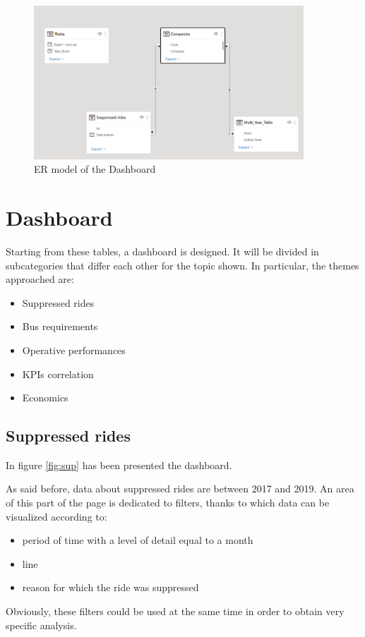 \begin{figure}[h]
    \centering
    \includegraphics[width=0.9\textwidth]{Images/traditional_dashboard/ER_model.png}
    \caption{ER model of the Dashboard}
    \label{fig:ER}
\end{figure}
\section{Dashboard}

Starting from these tables, a dashboard is designed. It will be divided in subcategories that differ each other for the topic shown. In particular, the themes approached are:
\begin{itemize}
\item Suppressed rides
\item Bus requirements
\item Operative performances
\item KPIs correlation
\item Economics
\end{itemize}
\subsection{Suppressed rides}
In figure \ref{fig:sup} has been presented the dashboard.
\newpage
\WarningsOff
\begin{landscape}
\thispagestyle{empty}

\end{landscape}
\newpage
As said before, data about suppressed rides are between 2017 and 2019. An area of this part of the page is dedicated to filters, thanks to which data can be visualized according to:
\begin{itemize}
\item  period of time with a level of detail equal to a month
\item line
\item reason for which the ride was suppressed
\end{itemize}
Obviously, these filters could be used at the same time in order to obtain very specific analysis.

